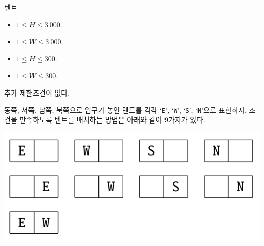\begin{problem}{텐트}
	
	\Constraints
	
	\begin{itemize}
		\item $1 \le H \le 3\ 000$.
		\item $1 \le W \le 3\ 000$.
	\end{itemize}
	
	
	\begin{itemize}
		\item $1 \le H \le 300$.
		\item $1 \le W \le 300$.
	\end{itemize}

	
	추가 제한조건이 없다.
	
	\Examples
	
	\begin{example}
	\end{example}
	
	동쪽, 서쪽, 남쪽, 북쪽으로 입구가 놓인 텐트를 각각 `\texttt{E}', `\texttt{W}', `\texttt{S}', `\texttt{N}'으로 표현하자. 조건을 만족하도록 텐트를 배치하는 방법은 아래와 같이 9가지가 있다.
	
	\includegraphics[width=0.35\linewidth]{img1.png}
	
	\begin{example}
	\end{example}
	
	
\end{problem}

